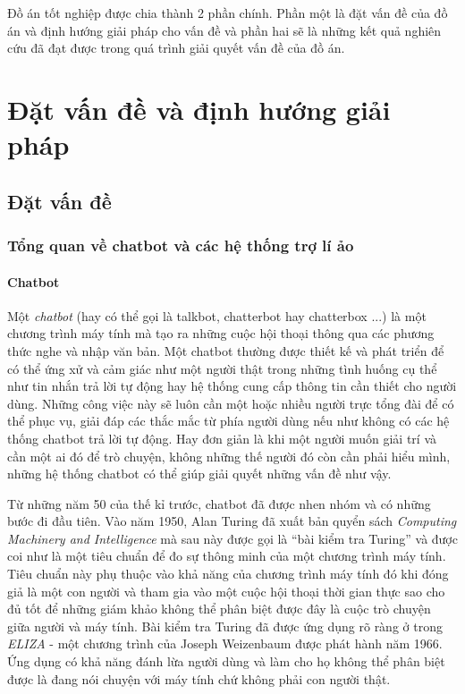 \documentclass[12pt]{report}
\begin{document}
Đồ án tốt nghiệp được chia thành 2 phần chính. Phần một là đặt vấn đề của đồ án và định hướng giải pháp cho vấn đề và phần hai sẽ là những kết quả nghiên cứu đã đạt được trong quá trình giải quyết vấn đề của đồ án.

\newpage
\setcounter{page}{1}

\newcommand{\alice}{A.L.I.C.E}

\part{Đặt vấn đề và định hướng giải pháp}

\startcontents[parts]

\chapter{Đặt vấn đề}
\section{Tổng quan về chatbot và các hệ thống trợ lí ảo}
\subsection{Chatbot}
Một \textit{chatbot} (hay có thể gọi là talkbot, chatterbot hay chatterbox ...) là một chương trình máy tính mà tạo ra những cuộc hội thoại thông qua các phương thức nghe và nhập văn bản\cite{chatbot-wiki}. Một chatbot thường được thiết kế và phát triển để có thể ứng xử và cảm giác như một người thật trong những tình huống cụ thể như tin nhắn trả lời tự động hay hệ thống cung cấp thông tin cần thiết cho người dùng. Những công việc này sẽ luôn cần một hoặc nhiều người trực tổng đài để có thể phục vụ, giải đáp các thắc mắc từ phía người dùng nếu như không có các hệ thống chatbot trả lời tự động. Hay đơn giản là khi một người muốn giải trí và cần một ai đó để trò chuyện, không những thế người đó còn cần phải hiểu mình, những hệ thống chatbot có thể giúp giải quyết những vấn đề như vậy.

Từ những năm 50 của thế kỉ trước, chatbot đã được nhen nhóm và có những bước đi đầu tiên. Vào năm 1950, Alan Turing đã xuất bản quyển sách \textit{Computing Machinery and Intelligence} mà sau này được gọi là ``bài kiểm tra Turing'' và được coi như là một tiêu chuẩn để đo sự thông minh của một chương trình máy tính. Tiêu chuẩn này phụ thuộc vào khả năng của chương trình máy tính đó khi đóng giả là một con người và tham gia vào một cuộc hội thoại thời gian thực sao cho đủ tốt để những giám khảo không thể phân biệt được đây là cuộc trò chuyện giữa người và máy tính. Bài kiểm tra Turing đã được ứng dụng rõ ràng ở trong \textit{ELIZA} - một chương trình của Joseph Weizenbaum được phát hành năm 1966. Ứng dụng có khả năng đánh lừa người dùng và làm cho họ không thể phân biệt được là đang nói chuyện với máy tính chứ không phải con người thật.
\end{document}
